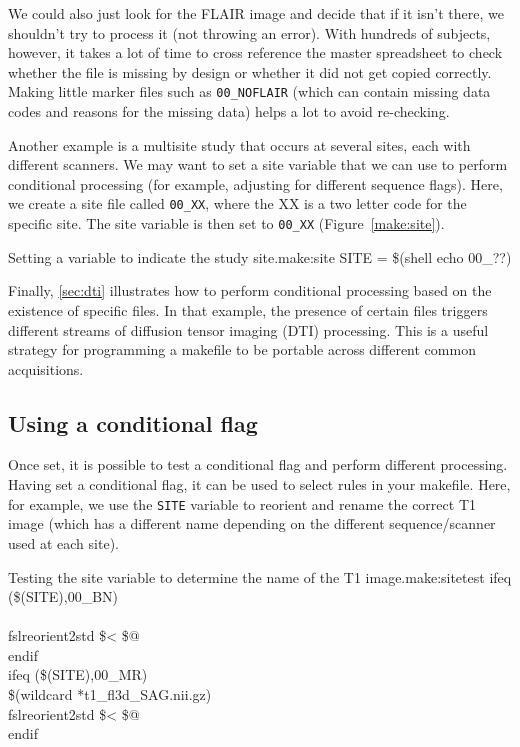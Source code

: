 We could also just look for the FLAIR image and decide that if it isn't there, we shouldn't try to process it (not throwing an error). With hundreds of subjects, however, it takes a lot of time to cross reference the master spreadsheet to check whether the file is missing by design or whether it did not get copied correctly. Making little marker files such as \texttt{00\_NOFLAIR} (which can contain missing data codes and reasons for the missing data) helps a lot to avoid re-checking.  

Another example is a multisite study that occurs at several sites, each with different scanners. We may want to set a site variable that we can use to perform conditional processing (for example, adjusting for different sequence flags). Here, we create a site file called \texttt{00\_XX}, where the XX is a two letter code for the specific site. The site variable is then set to \texttt{00\_XX} (Figure~\ref{make:site}).

\begin{make}{Setting a variable to indicate the study site.}{make:site}
SITE = \$(shell echo 00\_??)
\end{make}

Finally, \autoref{sec:dti} illustrates how to perform conditional processing based on the existence of specific files. In that example, the presence of certain files triggers different streams of diffusion tensor imaging (DTI) processing. This is a useful strategy for programming a makefile to be portable across different common acquisitions. 

\subsection{Using a conditional flag}
Once set, it is possible to test a conditional flag and perform different processing. Having set a conditional flag, it can be used to select rules in your makefile. Here, for example, we use the \texttt{SITE} variable to reorient and rename the correct T1 image (which has a different name depending on the different sequence/scanner used at each site). 

\begin{make}{Testing the site variable to determine the name of the T1 image.}{make:sitetest}
ifeq (\$(SITE),00_BN) \\
\\
     \tab fslreorient2std \$< \$@    \\
endif \\

ifeq (\$(SITE),00_MR) \\
 {\$(wildcard *t1_fl3d_SAG.nii.gz)} \\
    \tab  fslreorient2std \$< \$@    \\
endif
\end{make}


